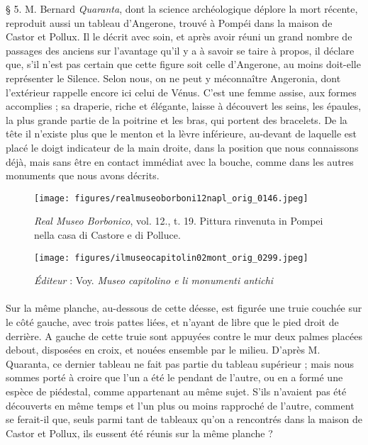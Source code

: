 \documentclass[a4paper, 11pt, oneside, polutonikogreek, french]{article}
\begin{document}
§ 5. M. Bernard \emph{Quaranta}, dont la science archéologique déplore la mort récente, reproduit aussi un tableau d'Angerone, trouvé à Pompéi dans la maison de Castor et Pollux. Il le décrit avec soin, et après avoir réuni un grand nombre de passages des anciens sur l'avantage qu'il y a à savoir se taire à propos, il déclare que, s'il n'est pas certain que cette figure soit celle d'Angerone, au moins doit-elle représenter le Silence. Selon nous, on ne peut y méconnaître Angeronia, dont l'extérieur rappelle encore ici celui de Vénus. C'est une femme assise, aux formes accomplies ; sa draperie, riche et élégante, laisse à découvert les seins, les épaules, la plus grande partie de la poitrine et les bras, qui portent des bracelets. De la tête il n'existe plus que le menton et la lèvre inférieure, au-devant de laquelle est placé le doigt indicateur de la main droite, dans la position que nous connaissons déjà, mais sans être en contact immédiat avec la bouche, comme dans les autres monuments que nous avons décrits.
\clearpage
\vspace*{\fill}
\begin{figure}[H]
\centering
\texttt{[image: figures/realmuseoborboni12napl\_orig\_0146.jpeg]}
\caption{\emph{Real Museo Borbonico}, vol. 12., t. 19. Pittura rinvenuta in Pompei nella casa di Castore e di Polluce.}
\end{figure}
\vspace*{\fill}
\clearpage
\vspace*{\fill}
\begin{figure}[H]
\centering
\texttt{[image: figures/ilmuseocapitolin02mont\_orig\_0299.jpeg]}
\caption{\emph{Éditeur} : Voy. \emph{Museo capitolino e li monumenti antichi}}
\end{figure}
\vspace*{\fill}
\clearpage
\paragraph{}
Sur la même planche, au-dessous de cette déesse, est figurée une truie couchée sur le côté gauche, avec trois pattes liées, et n'ayant de libre que le pied droit de derrière. A gauche de cette truie sont appuyées contre le mur deux palmes placées debout, disposées en croix, et nouées ensemble par le milieu. D'après M. Quaranta, ce dernier tableau ne fait pas partie du tableau supérieur ; mais nous sommes porté à croire que l'un a été le pendant de l'autre, ou en a formé une espèce de piédestal, comme appartenant au même sujet. S'ils n'avaient pas été découverts en même temps et l'un plus ou moins rapproché de l'autre, comment se ferait-il que, seuls parmi tant de tableaux qu'on a rencontrés dans la maison de Castor et Pollux, ils eussent été réunis sur la même planche ?
\end{document}
